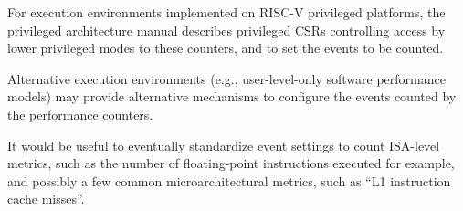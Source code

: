 \begin{commentary}
  For execution environments implemented on RISC-V privileged
  platforms, the privileged architecture manual describes privileged
  CSRs controlling access by lower privileged modes to these counters,
  and to set the events to be counted.

  Alternative execution environments (e.g., user-level-only software
  performance models) may provide alternative mechanisms to configure
  the events counted by the performance counters.

  It would be useful to eventually standardize event settings to count
  ISA-level metrics, such as the number of floating-point instructions
  executed for example, and possibly a few common microarchitectural
  metrics, such as ``L1 instruction cache misses''.
\end{commentary}
